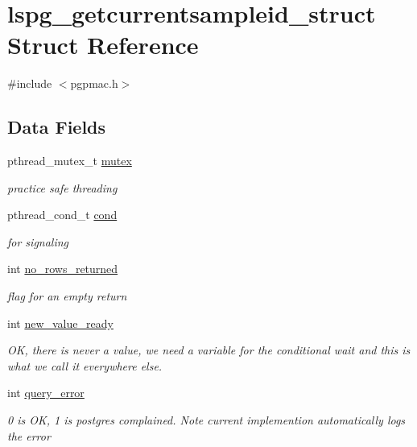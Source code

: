 \hypertarget{structlspg__getcurrentsampleid__struct}{\section{lspg\-\_\-getcurrentsampleid\-\_\-struct Struct Reference}
\label{structlspg__getcurrentsampleid__struct}
}


{\ttfamily \#include $<$pgpmac.\-h$>$}

\subsection*{Data Fields}
\begin{DoxyCompactItemize}
\item 
pthread\-\_\-mutex\-\_\-t \hyperlink{structlspg__getcurrentsampleid__struct_ace54acbdcbce620437962858ba04e256}{mutex}
\begin{DoxyCompactList}\small\item\em practice safe threading \end{DoxyCompactList}\item 
pthread\-\_\-cond\-\_\-t \hyperlink{structlspg__getcurrentsampleid__struct_a289960e45fdc9339a05dc8607f1b7563}{cond}
\begin{DoxyCompactList}\small\item\em for signaling \end{DoxyCompactList}\item 
int \hyperlink{structlspg__getcurrentsampleid__struct_a06758730db55730eb10d2d63e2520d71}{no\-\_\-rows\-\_\-returned}
\begin{DoxyCompactList}\small\item\em flag for an empty return \end{DoxyCompactList}\item 
int \hyperlink{structlspg__getcurrentsampleid__struct_ada3840f03195ee1807150f1e75fd3775}{new\-\_\-value\-\_\-ready}
\begin{DoxyCompactList}\small\item\em O\-K, there is never a value, we need a variable for the conditional wait and this is what we call it everywhere else. \end{DoxyCompactList}\item 
int \hyperlink{structlspg__getcurrentsampleid__struct_ac81d3b649befe470ef32453c9b83d334}{query\-\_\-error}
\begin{DoxyCompactList}\small\item\em 0 is O\-K, 1 is postgres complained. Note current implemention automatically logs the error \end{DoxyCompactList}\item 

\end{DoxyCompactItemize}
